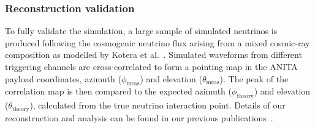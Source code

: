 \subsubsection{Reconstruction validation}
\label{subsec:ANITA_validation_reconstruction}
To fully validate the simulation, a large sample of simulated
neutrinos is produced following the cosmogenic neutrino flux arising from a mixed cosmic-ray composition as modelled by Kotera et al.~\cite{kotera}.
Simulated waveforms from different triggering channels are
cross-correlated to form a pointing map in the ANITA payload
coordinates, azimuth ($\phi_{\mathrm{meas}}$) and elevation
($\theta_{\mathrm{meas}}$). 
The peak of the correlation map is then compared to the expected
azimuth ($\phi_{\mathrm{theory}}$) and elevation
($\theta_{\mathrm{theory}}$), calculated from the true neutrino interaction point.
Details of our reconstruction and analysis can be found in our
previous publications~\cite{ANITA1paper,ANITA2paper,romero2015interferometric}.






